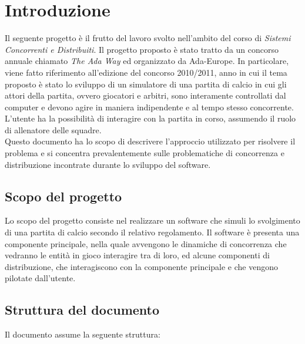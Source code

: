 
\section{Introduzione}
\label{sec:introduzione}

Il seguente progetto è il frutto del lavoro svolto nell'ambito del corso di \emph{Sistemi Concorrenti e Distribuiti}. Il progetto proposto è stato tratto da un concorso annuale chiamato \emph{The Ada Way} ed organizzato da Ada-Europe. In particolare, viene fatto riferimento all'edizione del concorso 2010/2011, anno in cui il tema proposto è stato lo sviluppo di un simulatore di una partita di calcio in cui gli attori della partita, ovvero giocatori e arbitri, sono interamente controllati dal computer e devono agire in maniera indipendente e al tempo stesso concorrente. L'utente ha la possibilità di interagire con la partita in corso, assumendo il ruolo di allenatore delle squadre.\\

Questo documento ha lo scopo di descrivere l'approccio utilizzato per risolvere il problema e si concentra prevalentemente sulle problematiche di concorrenza e distribuzione incontrate durante lo sviluppo del software.

\subsection{Scopo del progetto}
\label{sec:scopo_del_progetto}

Lo scopo del progetto consiste nel realizzare un software che simuli lo svolgimento di una partita di calcio secondo il relativo regolamento. Il software è presenta una componente principale, nella quale avvengono le dinamiche di concorrenza che vedranno le entità in gioco interagire tra di loro, ed alcune componenti di distribuzione, che interagiscono con la componente principale e che vengono pilotate dall'utente.

\subsection{Struttura del documento}
\label{sec:struttura_del_documento}

Il documento assume la seguente struttura:

